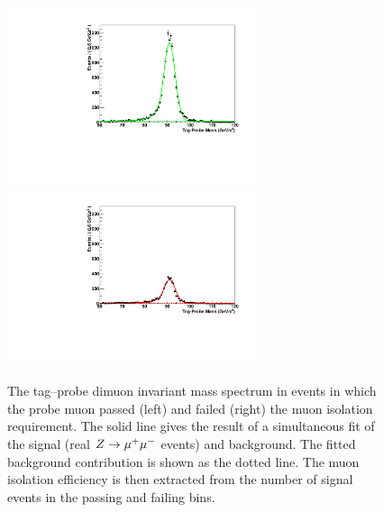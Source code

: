 \begin{figure}[t]
\begin{center}
\includegraphics*[height=52mm]{corrections_chapter/tag_probe_data/plot_0.pdf}
\includegraphics*[height=52mm]{corrections_chapter/tag_probe_data/plot_1.pdf}
\caption[Tag--probe muon isolation method]{The tag--probe dimuon invariant mass
spectrum in events in which the probe muon passed (left) and failed (right) the
muon isolation requirement.  The solid line gives the result of a simultaneous fit
of the signal (real $Z\to\mu^+\mu^-$ events) and background.  The fitted background
contribution is shown as the dotted line.  The muon isolation efficiency is then
extracted from the number of signal events in the passing and failing bins.}
\label{fig:TagAndProbeFits}
\end{center}
\end{figure} 
